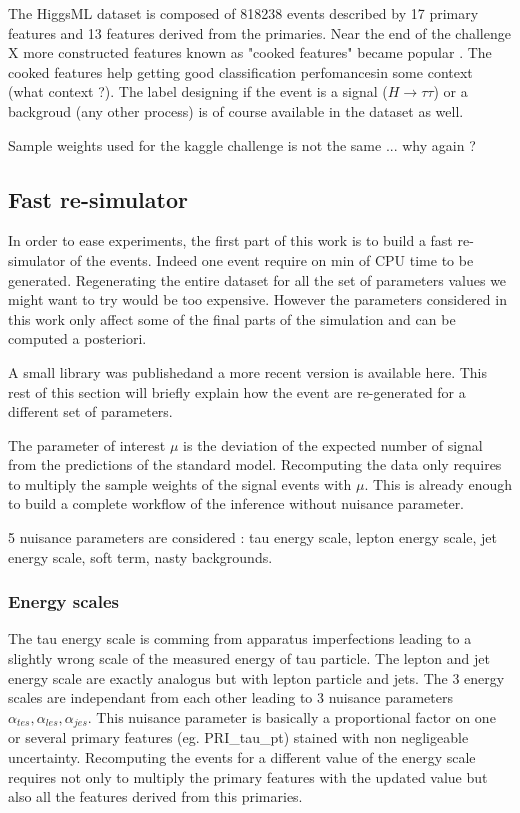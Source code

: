 The HiggsML dataset is composed of 818238 events described by 17 primary features and 13 features derived from the primaries.
Near the end of the challenge X more constructed features known as "cooked features" became popular \needcite.
The cooked features help getting good classification perfomances\needcite in some context (what context ?).
The label designing if the event is a signal ($H\to \tau \tau$) or a backgroud (any other process) is of course available in the dataset as well.

Sample weights used for the kaggle challenge is not the same ... why again ?




\subsection{Fast re-simulator} %
\label{sub:fast_re_simulator}


In order to ease experiments, the first part of this work is to build a fast re-simulator of the events.
Indeed one event require on min of CPU time to be generated.
Regenerating the entire dataset for all the set of parameters values we might want to try would be too expensive.
However the parameters considered in this work only affect some of the final parts of the simulation and can be computed a posteriori.

A small library was published\needcite and a more recent version is available here\needcite.
This rest of this section will briefly explain how the event are re-generated for a different set of parameters.

The parameter of interest $\mu$ is the deviation of the expected number of signal from the predictions of the standard model.
Recomputing the data only requires to multiply the sample weights of the signal events with $\mu$.
This is already enough to build a complete workflow of the inference without nuisance parameter.

5 nuisance parameters are considered : tau energy scale, lepton energy scale, jet energy scale, soft term, nasty backgrounds.

\subsubsection{Energy scales} %
\label{ssub:energy_scales}

The tau energy scale is comming from apparatus imperfections leading to a slightly wrong scale of the measured energy of tau particle.
The lepton and jet energy scale are exactly analogus but with lepton particle and jets.
The 3 energy scales are independant from each other leading to 3 nuisance parameters $\alpha_{tes}, \alpha_{les}, \alpha_{jes}$. 
This nuisance parameter is basically a proportional factor on one or several primary features (eg. PRI\_tau\_pt) stained with non negligeable uncertainty.
Recomputing the events for a different value of the energy scale requires not only to multiply the primary features with the updated value but also all the features derived from this primaries.


